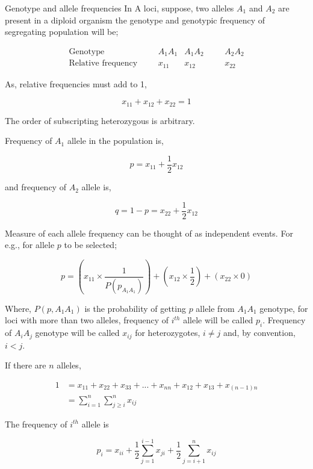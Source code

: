 \documentclass[11pt,dvipsnames,ignorenonframetext,aspectratio=169]{beamer}
\begin{document}
\begin{frame}{Genotype and allele frequencies}
\protect\hypertarget{genotype-and-allele-frequencies}{}
In A loci, suppose, two alleles \(A_1\) and \(A_2\) are present in a
diploid organism the genotype and genotypic frequency of segregating
population will be;

\[
\begin{aligned}
\textrm{Genotype} \hspace{20pt} & A_1A_1 & A_1A_2 \hspace{20pt} & A_2A_2 \\
\textrm{Relative frequency} \hspace{20pt} & x_{11} & x_{12} \hspace{20pt} & x_{22}
\end{aligned}
\]

As, relative frequencies must add to 1,

\[
x_{11} + x_{12} + x_{22} = 1
\]

The order of subscripting heterozygous is arbitrary.

Frequency of \(A_1\) allele in the population is,

\[
p = x_{11} + \frac{1}{2}x_{12}
\]
\end{frame}

\begin{frame}{}
\protect\hypertarget{section-11}{}
and frequency of \(A_2\) allele is,

\[
q = 1-p = x_{22} + \frac{1}{2}x_{12}
\]

Measure of each allele frequency can be thought of as independent
events. For e.g., for allele \(p\) to be selected;

\[
p = \left(x_{11} \times \frac{1}{P(p_{A_1A_1})}\right) + \left(x_{12} \times \frac{1}{2}\right) + (x_{22} \times 0)
\]

Where, \(P(p, A_1A_1)\) is the probability of getting \(p\) allele from
\(A_1A_1\) genotype, for loci with more than two alleles, frequency of
\(i^{th}\) allele will be called \(p_i\). Frequency of \(A_iA_j\)
genotype will be called \(x_{ij}\) for heterozygotes, \(i\neq j\) and,
by convention, \(i<j\).
\end{frame}

\begin{frame}{}
\protect\hypertarget{section-12}{}
If there are \(n\) alleles,

\[
\begin{aligned}
1 &= x_{11} + x_{22} + x_{33} + ... + x_{nn} + x_{12} + x_{13} + x_{(n-1)n} \\
  &= \sum^n_{i=1}\sum^n_{j\geq i}{x_{ij}}
\end{aligned}
\]

The frequency of \(i^{th}\) allele is

\[
p_i = x_{ii} + \frac{1}{2}\sum^{i-1}_{j = 1}{x_{ji}} + \frac{1}{2}\sum^n_{j = i+1}{x_{ij}}
\]
\end{frame}
\end{document}
